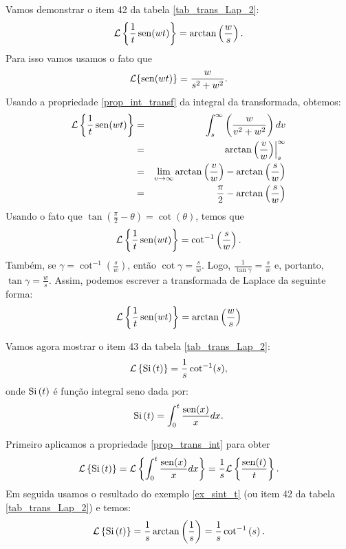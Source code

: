 \begin{ex}{\label{ex_sint_t}}Vamos demonstrar o item 42 da tabela \ref{tab_trans_Lap_2}:
$$
\mathcal{L}\left\{\frac{1}{t}\operatorname{sen}(wt)\right\}=\arctan\left(\frac{w}{s}\right).
$$
Para isso vamos usamos o fato que
\begin{equation*}
\mathcal{L}\{\operatorname{sen}(wt)\}=\frac{w}{s^2+w^2}.
\end{equation*}
Usando a propriedade \ref{prop_int_transf} da integral da transformada, obtemos:
\begin{eqnarray*}
\mathcal{L}\left\{\frac{1}{t}\operatorname{sen}(wt)\right\}&=&\int_s^\infty \left(\frac{w}{v^2+w^2}\right)dv\\
&=& \left.\arctan\left(\frac{v}{w}\right)\right|_s^\infty\\
&=&\lim_{v\to\infty}\arctan\left(\frac{v}{w}\right)-\arctan\left(\frac{s}{w}\right)\\
&=&\frac{\pi}{2}-\arctan\left(\frac{s}{w}\right)\\
\end{eqnarray*}
Usando o fato que $\tan\left(\frac{\pi}{2}-\theta\right)=\cot(\theta)$, temos que
\begin{eqnarray*}
\mathcal{L}\left\{\frac{1}{t}\operatorname{sen}(wt)\right\}=\cot^{-1}\left(\frac{s}{w}\right).
\end{eqnarray*}
Também, se $\gamma=\cot^{-1}\left(\frac{s}{w}\right)$, então $\cot\gamma=\frac{s}{w}$. Logo, $\frac{1}{\tan\gamma}=\frac{s}{w}$ e, portanto, $\tan\gamma=\frac{w}{s}$. Assim, podemos escrever a transformada de Laplace da seguinte forma:
\begin{eqnarray*}
\mathcal{L}\left\{\frac{1}{t}\operatorname{sen}(wt)\right\}=\arctan\left(\frac{w}{s}\right)
\end{eqnarray*}
\end{ex}

\begin{ex}Vamos agora mostrar o item 43 da tabela \ref{tab_trans_Lap_2}:
$$
\mathcal{L}\left\{\hbox{Si}\ \!(t)\right\}=\frac{1}{s}\cot^{-1}(s),
$$
onde $\hbox{Si}\ \!(t)$ é função integral seno dada por:
$$
\hbox{Si}\ \!(t)=\int_0^t\frac{\sen(x)}{x}dx.
$$

Primeiro aplicamos a propriedade \ref{prop_trans_int} para obter
$$
\mathcal{L}\left\{\hbox{Si}\ \!(t)\right\}=\mathcal{L}\left\{\int_0^t\frac{\sen(x)}{x}dx\right\}=\frac{1}{s}\mathcal{L}\left\{\frac{\sen(t)}{t}\right\}.
$$
Em seguida usamos o resultado do exemplo \ref{ex_sint_t} (ou item 42 da tabela \ref{tab_trans_Lap_2}) e temos:
$$
\mathcal{L}\left\{\hbox{Si}\ \!(t)\right\}=\frac{1}{s}\arctan\left(\frac{1}{s}\right)=\frac{1}{s}\cot^{-1}\left(s\right).
$$
\end{ex}
